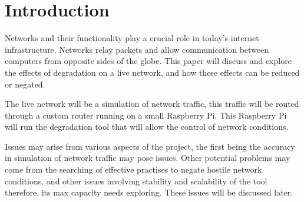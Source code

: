 \chapter{Introduction}
Networks and their functionality play a crucial role in today's internet infrastructure. Networks relay packets and allow communication between computers from opposite sides of the globe. This paper will discuss and explore the effects of degradation on a live network, and how these effects can be reduced or negated. 

The live network will be a simulation of network traffic, this traffic will be routed through a custom router running on a small Raspberry Pi. This Raspberry Pi will run the degradation tool that will allow the control of network conditions. 

Issues may arise from various aspects of the project, the first being the accuracy in simulation of network traffic may pose issues. Other potential problems may come from the searching of effective practises to negate hostile network conditions, and other issues involving stability and scalability of the tool therefore, its max capacity needs exploring. These issues will be discussed later.


